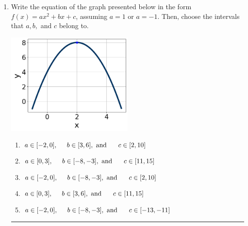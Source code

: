 \documentclass[14pt]{extbook}
\newcommand{\litem}[1]{\item#1\hspace*{-1cm}\rule{\textwidth}{0.4pt}}
\begin{document}
\begin{enumerate}
\litem{
Write the equation of the graph presented below in the form $f(x)=ax^2+bx+c$, assuming  $a=1$ or $a=-1$. Then, choose the intervals that $a, b,$ and $c$ belong to.
\begin{center}
    \includegraphics[width=0.5\textwidth]{../Figures/quadraticGraphToEquationC.png}
\end{center}
\begin{enumerate}[label=\Alph*.]
\item \( a \in [-2, 0], \hspace*{5mm} b \in [3, 6], \text{ and } \hspace*{5mm} c \in [2, 10] \)
\item \( a \in [0, 3], \hspace*{5mm} b \in [-8, -3], \text{ and } \hspace*{5mm} c \in [11, 15] \)
\item \( a \in [-2, 0], \hspace*{5mm} b \in [-8, -3], \text{ and } \hspace*{5mm} c \in [2, 10] \)
\item \( a \in [0, 3], \hspace*{5mm} b \in [3, 6], \text{ and } \hspace*{5mm} c \in [11, 15] \)
\item \( a \in [-2, 0], \hspace*{5mm} b \in [-8, -3], \text{ and } \hspace*{5mm} c \in [-13, -11] \)


\end{enumerate}}
\end{enumerate}
\end{document}
